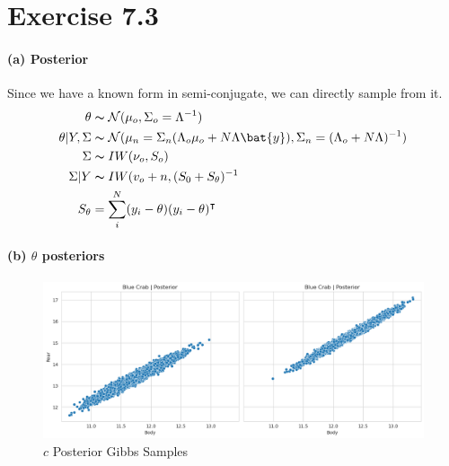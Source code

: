 \documentclass[11pt, letterpaper]{article}
\begin{document}
\section{Exercise 7.3}
\paragraph{(a) Posterior}
Since we have a known form in semi-conjugate, we can directly sample from it.
\begin{align*}
    \theta &\thicksim \mathcal{N}(\mu_o, \Sigma_o = \Lambda^{-1}) \\
    \theta|Y, \Sigma &\thicksim \mathcal{N}(
        \mu_n = \Sigma_n(\Lambda_o\mu_o+N\Lambda\bat{y}),
        \Sigma_n = (\Lambda_o + N\Lambda)^{-1}
    ) \\
    \Sigma &\thicksim IW(\nu_o, S_o) \\ 
    \Sigma|Y &\thicksim IW(v_o + n, (S_0+S_{\theta})^{-1} \\
    S_{\theta} &= \sum_i^N (y_i - \theta)(y_i - \theta)^{\intercal}
\end{align*}

\paragraph{(b) $\theta$ posteriors}
\begin{figure}[!h]
  \centering
  \includegraphics[width=1.0\textwidth]{3.1.png}
  \captionsetup{justification=centering}
  \caption{$c$ Posterior Gibbs Samples}
\end{figure}
\end{document}
